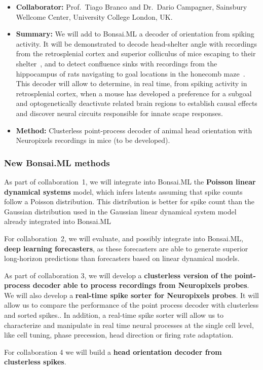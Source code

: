 \begin{itemize}

    \item\textbf{Collaborator:} Prof.~Tiago Branco and Dr.~Dario Campagner,
        Sainsbury Wellcome Center, University College London, UK.

    \item\textbf{Summary:} We will add to Bonsai.ML a decoder of orientation
        from spiking activity. It will be demonstrated to decode head-shelter
        angle with
        recordings from the retrosplenial cortex and superior colliculus of mice escaping to their
        shelter~\citep{campagnerEtAl22}, and to detect confluence sinks with
        recordings from the hippocampus of rats navigating to goal locations in
        the honecomb maze~\cite{woodEtAl18}.
        This decoder will allow to determine, in real time, from spiking activity in
        retrosplenial cortex, when a mouse has developed a preference for a
        subgoal and optogenetically deactivate related brain regions to
        establish causal effects and discover neural circuits responsible for
        innate scape responses.

    \item\textbf{Method:} Clusterless point-process decoder of animal head
        orientation with Neuropixels recordings in mice (to be developed).

\end{itemize}

\subsubsection{New Bonsai.ML methods}

As part of collaboration~1, we will integrate into Bonsai.ML the \textbf{Poisson
linear dynamical systems} model, which infers latents assuming that spike
counts follow a Poisson distribution. This distribution is better for spike
count than the Gaussian distribution used in the Gaussian linear dynamical
system model already integrated into Bonsai.ML

For collaboration~2, we will evaluate, and possibly integrate into Bonsai.ML,
\textbf{deep learning forecasters}, as these forecasters are able to generate
superior long-horizon predictions than forecasters based on linear dynamical
models.

As part of collaboration 3, we will develop a \textbf{clusterless version of
the point-process decoder able to process recordings from Neuropixels probes}.
%
We will also develop a \textbf{real-time spike sorter for Neuropixels probes}.
%
It will allow us to compare the performance of the point process decoder with
clusterless and sorted spikes..
%
In addition, a real-time spike sorter will allow us to characterize and
manipulate in real time neural processes at the single cell level, like cell
tuning, phase precession, head direction or firing rate adaptation.

For collaboration 4 we will build a \textbf{head orientation decoder from
clusterless spikes}.
